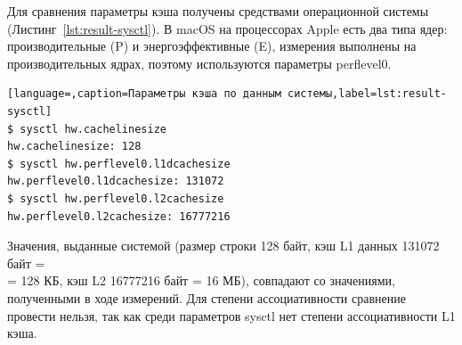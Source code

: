  \par
Для сравнения параметры кэша получены средствами операционной системы (Листинг~\ref{lst:result-sysctl}). В macOS на процессорах Apple есть два типа ядер: производительные (P) и энергоэффективные (E), измерения выполнены на производительных ядрах, поэтому используются параметры perflevel0.

\newpage

\begin{lstlisting}[language=,caption=Параметры кэша по данным системы,label=lst:result-sysctl]
$ sysctl hw.cachelinesize
hw.cachelinesize: 128
$ sysctl hw.perflevel0.l1dcachesize
hw.perflevel0.l1dcachesize: 131072
$ sysctl hw.perflevel0.l2cachesize
hw.perflevel0.l2cachesize: 16777216
\end{lstlisting}
\par
Значения, выданные системой (размер строки 128 байт, кэш L1 данных 131072 байт = \\ = 128 КБ, кэш L2 16777216 байт = 16 МБ), совпадают со значениями, полученными в ходе измерений. 
Для степени ассоциативности сравнение провести нельзя, так как среди параметров sysctl нет степени ассоциативности L1 кэша.

\newpage
